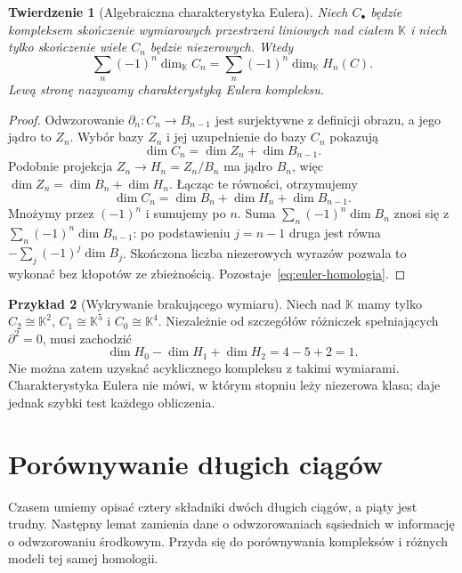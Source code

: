 \documentclass[11pt,a4paper,oneside]{report}
\theoremstyle{plain}
\newtheorem{twierdzenie}{Twierdzenie}[section]
\theoremstyle{definition}
\newtheorem{przyklad}[twierdzenie]{Przykład}
\theoremstyle{remark}
\begin{document}
\begin{twierdzenie}[Algebraiczna charakterystyka Eulera]
\label{thm:euler-homologia}
Niech $C_\bullet$ będzie kompleksem
skończenie wymiarowych przestrzeni
liniowych nad ciałem $\mathbb K$
i niech tylko skończenie wiele $C_n$
będzie niezerowych. Wtedy
\begin{equation}\label{eq:euler-homologia}
 \sum_n(-1)^n\dim_{\mathbb K}C_n
 =\sum_n(-1)^n\dim_{\mathbb K}H_n(C).
\end{equation}
Lewą stronę nazywamy \emph{charakterystyką
Eulera kompleksu}.
\end{twierdzenie}
\begin{proof}
Odwzorowanie $\partial_n:C_n\to B_{n-1}$ jest
surjektywne z definicji obrazu,
a jego jądro to $Z_n$.
Wybór bazy $Z_n$ i jej uzupełnienie
do bazy $C_n$ pokazują
\[
 \dim C_n=\dim Z_n+\dim B_{n-1}.
\]
Podobnie projekcja $Z_n\to H_n=Z_n/B_n$
ma jądro $B_n$, więc
$\dim Z_n=\dim B_n+\dim H_n$.
Łącząc te równości, otrzymujemy
\[
 \dim C_n=\dim B_n+\dim H_n+\dim B_{n-1}.
\]
Mnożymy przez $(-1)^n$ i sumujemy
po $n$. Suma
$\sum_n(-1)^n\dim B_n$
znosi się z
$\sum_n(-1)^n\dim B_{n-1}$:
po podstawieniu $j=n-1$
druga jest równa
$-\sum_j(-1)^j\dim B_j$.
Skończona liczba niezerowych
wyrazów pozwala to wykonać bez
kłopotów ze zbieżnością.
Pozostaje~\eqref{eq:euler-homologia}.
\end{proof}

\begin{przyklad}[Wykrywanie brakującego wymiaru]
Niech nad $\mathbb K$ mamy tylko
$C_2\cong\mathbb K^2$, $C_1\cong\mathbb K^5$
i $C_0\cong\mathbb K^4$.
Niezależnie od szczegółów różniczek
spełniających $\partial^2=0$, musi zachodzić
\[
 \dim H_0-\dim H_1+\dim H_2
 =4-5+2=1.
\]
Nie można zatem uzyskać
acyklicznego kompleksu z takimi
wymiarami. Charakterystyka Eulera
nie mówi, w którym stopniu leży
niezerowa klasa; daje jednak
szybki test każdego obliczenia.
\end{przyklad}

\section{Porównywanie długich ciągów}
\label{sec:lemat-pieciu}

Czasem umiemy opisać cztery składniki
dwóch długich ciągów, a piąty jest trudny.
Następny lemat zamienia dane o odwzorowaniach
sąsiednich w informację o odwzorowaniu środkowym.
Przyda się do porównywania kompleksów
i różnych modeli tej samej homologii.
\end{document}
